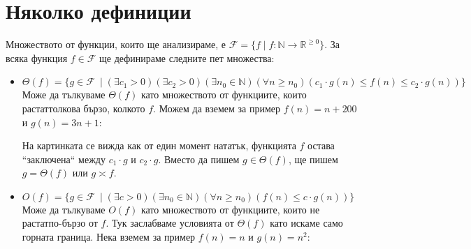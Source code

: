\documentclass{article}
\newcommand{\N}{\mathbb{N}}
\newcommand{\R}{\mathbb{R}}
\newcommand{\F}{\mathcal{F}}
\theoremstyle{definition}
\theoremstyle{plain}
\theoremstyle{remark}
\theoremstyle{definition}
\begin{document}
\section*{Няколко дефиниции}
Множеството от функции, които ще анализираме, е $\F = \{ f \mid f : \N \rightarrow \R^{\geq 0} \}$.
За всяка функция $f \in \F$ ще дефинираме следните пет множества:
\begin{itemize}
  \item $\Theta(f) = \{ g \in \F \: \mid (\exists c_1 > 0)(\exists c_2 > 0)(\exists n_0 \in \N)(\forall n \geq n_0)(c_1 \cdot g(n) \leq f(n) \leq c_2 \cdot g(n))\}$ \\
        Може да тълкуваме $\Theta(f)$ като множеството от функциите, които растат\footnotemark[1] толкова бързо, колкото $f$.
        Можем да вземем за пример $f(n) = n + 200$ и $g(n) = 3n + 1$:


        На картинката се вижда как от един момент нататък, функцията $f$ остава ``заключена`` между $c_1 \cdot g$ и $c_2 \cdot g$.
        Вместо да пишем $g \in \Theta(f)$, ще пишем $g = \Theta(f)$ или $g \asymp f$.
  \item $O(f) = \{ g \in \F \: \mid (\exists c > 0)(\exists n_0 \in \N)(\forall n \geq n_0)(f(n) \leq c \cdot g(n))\}$ \\
        Може да тълкуваме $O(f)$ като множеството от функциите, които не растат\footnotemark[1] по-бързо от $f$.
        Тук заслабваме условията от $\Theta(f)$ като искаме само горната граница.
        Нека вземем за пример $f(n) = n$ и $g(n) = n^2$:



\end{itemize}
\end{document}
